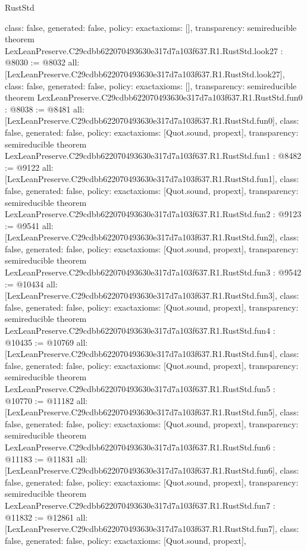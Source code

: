 \begin{lexlean}{RustStd}
\begin{coremodule}
{  class: false,
  generated: false,
  policy: exact{axioms: []},
  transparency: semireducible
}
theorem LexLeanPreserve.C29cdbb622070493630e317d7a103f637.R1.RustStd.look27 : @8030 := @8032 {
  all: [LexLeanPreserve.C29cdbb622070493630e317d7a103f637.R1.RustStd.look27],
  class: false,
  generated: false,
  policy: exact{axioms: []},
  transparency: semireducible
}
theorem LexLeanPreserve.C29cdbb622070493630e317d7a103f637.R1.RustStd.fun0 : @8038 := @8481 {
  all: [LexLeanPreserve.C29cdbb622070493630e317d7a103f637.R1.RustStd.fun0],
  class: false,
  generated: false,
  policy: exact{axioms: [Quot.sound, propext]},
  transparency: semireducible
}
theorem LexLeanPreserve.C29cdbb622070493630e317d7a103f637.R1.RustStd.fun1 : @8482 := @9122 {
  all: [LexLeanPreserve.C29cdbb622070493630e317d7a103f637.R1.RustStd.fun1],
  class: false,
  generated: false,
  policy: exact{axioms: [Quot.sound, propext]},
  transparency: semireducible
}
theorem LexLeanPreserve.C29cdbb622070493630e317d7a103f637.R1.RustStd.fun2 : @9123 := @9541 {
  all: [LexLeanPreserve.C29cdbb622070493630e317d7a103f637.R1.RustStd.fun2],
  class: false,
  generated: false,
  policy: exact{axioms: [Quot.sound, propext]},
  transparency: semireducible
}
theorem LexLeanPreserve.C29cdbb622070493630e317d7a103f637.R1.RustStd.fun3 : @9542 := @10434 {
  all: [LexLeanPreserve.C29cdbb622070493630e317d7a103f637.R1.RustStd.fun3],
  class: false,
  generated: false,
  policy: exact{axioms: [Quot.sound, propext]},
  transparency: semireducible
}
theorem LexLeanPreserve.C29cdbb622070493630e317d7a103f637.R1.RustStd.fun4 : @10435 := @10769 {
  all: [LexLeanPreserve.C29cdbb622070493630e317d7a103f637.R1.RustStd.fun4],
  class: false,
  generated: false,
  policy: exact{axioms: [Quot.sound, propext]},
  transparency: semireducible
}
theorem LexLeanPreserve.C29cdbb622070493630e317d7a103f637.R1.RustStd.fun5 : @10770 := @11182 {
  all: [LexLeanPreserve.C29cdbb622070493630e317d7a103f637.R1.RustStd.fun5],
  class: false,
  generated: false,
  policy: exact{axioms: [Quot.sound, propext]},
  transparency: semireducible
}
theorem LexLeanPreserve.C29cdbb622070493630e317d7a103f637.R1.RustStd.fun6 : @11183 := @11831 {
  all: [LexLeanPreserve.C29cdbb622070493630e317d7a103f637.R1.RustStd.fun6],
  class: false,
  generated: false,
  policy: exact{axioms: [Quot.sound, propext]},
  transparency: semireducible
}
theorem LexLeanPreserve.C29cdbb622070493630e317d7a103f637.R1.RustStd.fun7 : @11832 := @12861 {
  all: [LexLeanPreserve.C29cdbb622070493630e317d7a103f637.R1.RustStd.fun7],
  class: false,
  generated: false,
  policy: exact{axioms: [Quot.sound, propext]},
}
\end{coremodule}
\end{lexlean}
